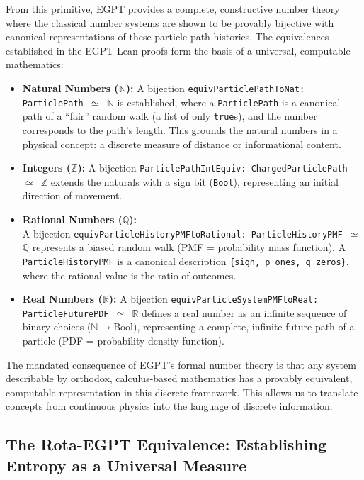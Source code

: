\documentclass[11pt, letterpaper]{article}
\begin{document}
From this primitive, EGPT provides a complete, constructive number theory where the classical number systems are shown to be provably bijective with canonical representations of these particle path histories. The equivalences established in the EGPT Lean proofs form the basis of a universal, computable mathematics:
\begin{itemize}
    \item \textbf{Natural Numbers ($\mathbb{N}$):} A bijection \texttt{equivParticlePathToNat: ParticlePath $\simeq$ $\mathbb{N}$} is established, where a \texttt{ParticlePath} is a canonical path of a ``fair'' random walk (a list of only \texttt{true}s), and the number corresponds to the path's length. This grounds the natural numbers in a physical concept: a discrete measure of distance or informational content.
    
    \item \textbf{Integers ($\mathbb{Z}$):} A bijection \texttt{ParticlePathIntEquiv: ChargedParticlePath $\simeq$ $\mathbb{Z}$} extends the naturals with a sign bit (\texttt{Bool}), representing an initial direction of movement.
    
    \item \textbf{Rational Numbers ($\mathbb{Q}$):} \\ A bijection \texttt{equivParticleHistoryPMFtoRational: ParticleHistoryPMF $\simeq$ $\mathbb{Q}$} represents a biased random walk (PMF = probability mass function). A \texttt{ParticleHistoryPMF} is a canonical description \texttt{\{sign, p ones, q zeros\}}, where the rational value is the ratio of outcomes.

    \item \textbf{Real Numbers ($\mathbb{R}$):} A bijection \texttt{equivParticleSystemPMFtoReal: ParticleFuturePDF $\simeq$ $\mathbb{R}$} defines a real number as an infinite sequence of binary choices ($\mathbb{N} \to \text{Bool}$), representing a complete, infinite future path of a particle (PDF = probability density function).
\end{itemize}
The mandated consequence of EGPT's formal number theory is that any system describable by orthodox, calculus-based mathematics has a provably equivalent, computable representation in this discrete framework. This allows us to translate concepts from continuous physics into the language of discrete information.

\subsection{The Rota-EGPT Equivalence: Establishing Entropy as a Universal Measure}
\label{sec:rota_egpt}
\end{document}
